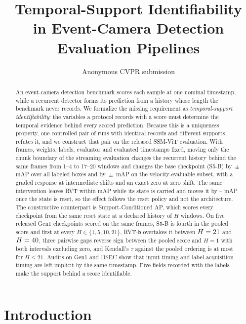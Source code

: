 \documentclass[10pt,twocolumn,letterpaper]{article}
\title{Temporal-Support Identifiability\\
in Event-Camera Detection Evaluation Pipelines}
\author{Anonymous CVPR submission}
\begin{document}
\maketitle

\begin{abstract}
An event-camera detection benchmark scores each sample at one nominal timestamp, while a recurrent detector forms its prediction from a history whose length the benchmark never records. We formalize the missing requirement as \emph{temporal-support identifiability}: the variables a protocol records with a score must determine the temporal evidence behind every scored prediction. Because this is a uniqueness property, one controlled pair of runs with identical records and different supports refutes it, and we construct that pair on the released SSM-ViT evaluation. With frames, weights, labels, evaluator and evaluated timestamps fixed, moving only the chunk boundary of the streaming evaluation changes the recurrent history behind the same \ssmPairedN{} frames from 1--4 to 17--20 windows and changes the base checkpoint (S5-B) by \ssmPairedMapAllBase\,$\pm$\,\ssmPairedMapAllBaseSE{} mAP over all labeled boxes and by \ssmPairedMapVelBase\,$\pm$\,\ssmPairedMapVelBaseSE{} mAP on the velocity-evaluable subset, with a graded response at intermediate shifts and an exact zero at zero shift. The same intervention leaves RVT within \rvtBoundCarryMax{} mAP while its state is carried and moves it by \rvtBoundResetS--\rvtBoundResetB{} mAP once the state is reset, so the effect follows the reset policy and not the architecture. The constructive counterpart is Support-Conditioned AP, which scores every checkpoint from the same reset state at a declared history of $H$ windows. On five released Gen1 checkpoints scored on the same \lhNFrames{} frames, S5-B is fourth in the pooled score and first at every $H\in\{1,5,10,21\}$, RVT-\texttt{b} overtakes it between $H=21$ and $H=40$, three pairwise gaps reverse sign between the pooled score and $H=1$ with both intervals excluding zero, and Kendall's $\tau$ against the pooled ordering is at most \lhTauHTwentyone{} for $H\le21$. Audits on Gen1 and DSEC show that input timing and label-acquisition timing are left implicit by the same timestamp. Five fields recorded with the labels make the support behind a score identifiable.
\end{abstract}

\section{Introduction}
\label{sec:intro}
\end{document}

